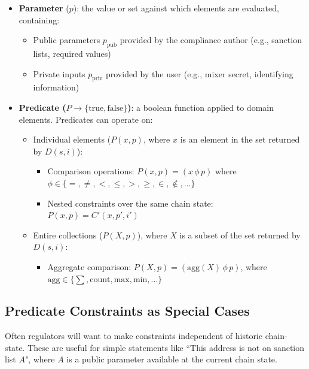 \documentclass[9pt]{extreport}
\begin{document}
\begin{itemize}
    \item \textbf{Parameter} ($p$): the value or set against which elements are evaluated, containing:
    \begin{itemize}
        \item Public parameters $p_{\text{pub}}$ provided by the compliance author (e.g., sanction lists, required values)
        \item Private inputs $p_{\text{priv}}$ provided by the user (e.g., mixer secret, identifying information)
    \end{itemize}
    
    \item \textbf{Predicate ($P \rightarrow \{\text{true}, \text{false}\}$)}: a boolean function applied to domain elements. Predicates can operate on:
    \begin{itemize}
        \item Individual elements ($P(x, p)$, where $x$ is an element in the set returned by $D(s, i)$):
        \begin{itemize}
            \item Comparison operations: $P(x, p) = (x \,\phi\, p)$ where $\phi \in \{=, \neq, <, \leq, >, \geq, \in, \notin, \ldots\}$
            \item Nested constraints over the same chain state: $P(x, p) = C'(x, p', i')$
        \end{itemize}
        \item Entire collections ($P(X, p)$), where $X$ is a subset of the set returned by $D(s, i)$:
        \begin{itemize}
            \item Aggregate comparison: $P(X, p) = (\text{agg}(X) \,\phi\, p)$, where\\ $\text{agg} \in \{\sum, \text{count}, \text{max}, \text{min}, \ldots\}$
        \end{itemize}
    \end{itemize}
\end{itemize}

\subsection{Predicate Constraints as Special Cases}
Often regulators will want to make constraints independent of historic chain-state.  These are useful for simple statements like ``This address is not on sanction list $A$", where $A$ is a public parameter available at the current chain state.
\end{document}
